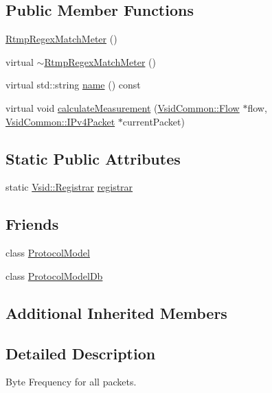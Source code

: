 \subsection*{Public Member Functions}
\begin{DoxyCompactItemize}
\item 
\hyperlink{class_vsid_1_1_rtmp_regex_match_meter_a768dfbb5453bff3318b34442f2787689}{Rtmp\-Regex\-Match\-Meter} ()
\item 
virtual \hyperlink{class_vsid_1_1_rtmp_regex_match_meter_a093f6e8baab732d1105c13c629b8087e}{$\sim$\-Rtmp\-Regex\-Match\-Meter} ()
\item 
virtual std\-::string \hyperlink{class_vsid_1_1_rtmp_regex_match_meter_aefe5e0684e01691437ae8870ab97e339}{name} () const 
\item 
virtual void \hyperlink{class_vsid_1_1_rtmp_regex_match_meter_a022b47400979bb33f907151d330ba872}{calculate\-Measurement} (\hyperlink{class_vsid_common_1_1_flow}{Vsid\-Common\-::\-Flow} $\ast$flow, \hyperlink{class_vsid_common_1_1_i_pv4_packet}{Vsid\-Common\-::\-I\-Pv4\-Packet} $\ast$current\-Packet)
\end{DoxyCompactItemize}
\subsection*{Static Public Attributes}
\begin{DoxyCompactItemize}
\item 
static \hyperlink{class_vsid_1_1_registrar}{Vsid\-::\-Registrar} \hyperlink{class_vsid_1_1_rtmp_regex_match_meter_ae1d6242aa5de0777da0be8a0df879ecd}{registrar}
\end{DoxyCompactItemize}
\subsection*{Friends}
\begin{DoxyCompactItemize}
\item 
class \hyperlink{class_vsid_1_1_rtmp_regex_match_meter_a80219b863d4ff3456933d16bc5f73f45}{Protocol\-Model}
\item 
class \hyperlink{class_vsid_1_1_rtmp_regex_match_meter_a3c0d389e7a9476b06313d8fb9ca9fe68}{Protocol\-Model\-Db}
\end{DoxyCompactItemize}
\subsection*{Additional Inherited Members}


\subsection{Detailed Description}
Byte Frequency for all packets. 

